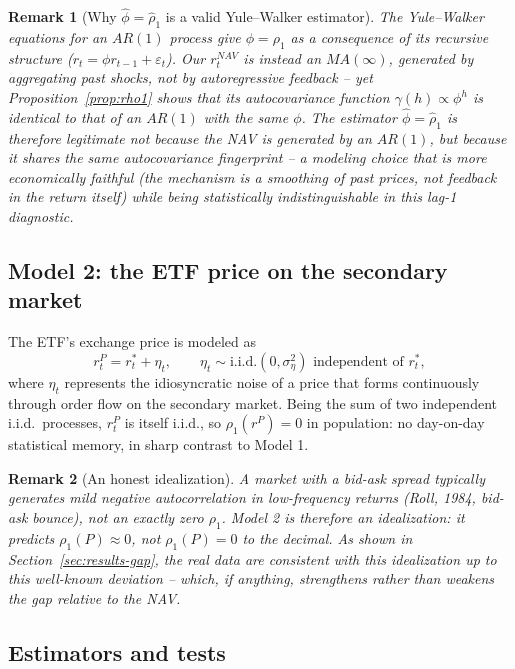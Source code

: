 \documentclass[11pt]{article}
\newtheorem{remark}{Remark}
\begin{document}
\begin{remark}[Why $\hat\phi = \hat\rho_1$ is a valid Yule--Walker estimator]
The Yule--Walker equations for an $AR(1)$ process give $\phi = \rho_1$ as a consequence of its recursive structure ($r_t = \phi r_{t-1} + \varepsilon_t$). Our $r^{NAV}_t$ is instead an $MA(\infty)$, generated by aggregating past shocks, not by autoregressive feedback -- yet Proposition~\ref{prop:rho1} shows that its autocovariance function $\gamma(h)\propto\phi^h$ is \emph{identical} to that of an $AR(1)$ with the same $\phi$. The estimator $\hat\phi=\hat\rho_1$ is therefore legitimate not because the NAV is generated by an $AR(1)$, but because it shares the same autocovariance fingerprint -- a modeling choice that is more economically faithful (the mechanism is a smoothing of past prices, not feedback in the return itself) while being statistically indistinguishable in this lag-1 diagnostic.
\end{remark}

\subsection{Model 2: the ETF price on the secondary market}
\label{sec:model2}

The ETF's exchange price is modeled as
\[
r^{P}_t = r^\ast_t + \eta_t, \qquad \eta_t \sim \text{i.i.d.}(0,\sigma_\eta^2) \text{ independent of } r^\ast_t,
\]
where $\eta_t$ represents the idiosyncratic noise of a price that forms continuously through order flow on the secondary market. Being the sum of two independent i.i.d.\ processes, $r^P_t$ is itself i.i.d., so $\rho_1(r^P) = 0$ in population: no day-on-day statistical memory, in sharp contrast to Model 1.

\begin{remark}[An honest idealization]
A market with a bid-ask spread typically generates mild \emph{negative} autocorrelation in low-frequency returns (Roll, 1984, bid-ask bounce), not an exactly zero $\rho_1$. Model 2 is therefore an idealization: it predicts $\rho_1(P)\approx 0$, not $\rho_1(P)=0$ to the decimal. As shown in Section~\ref{sec:results-gap}, the real data are consistent with this idealization up to this well-known deviation -- which, if anything, strengthens rather than weakens the gap relative to the NAV.
\end{remark}

\subsection{Estimators and tests}
\label{sec:estimators}
\end{document}
